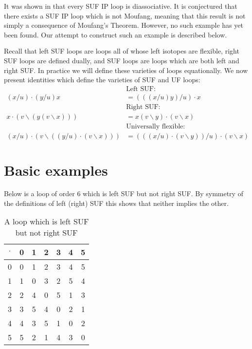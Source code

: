 \documentclass[12pt]{report}
\theoremstyle{definition}
\newcommand{\ldv}{\backslash}       %
\newcommand{\rdv}{/}                %
\begin{document}
It was shown in \cite{SUF} that every SUF IP loop is diassociative. It is conjectured that there
  exists a SUF IP loop which is not Moufang, meaning that this result is not simply a consequence
  of Moufang's Theorem. However, no such example has yet been found. Our attempt to construct such
  an example is described below.

Recall that left SUF loops are loops all of whose left isotopes are flexible, right SUF loops are
  defined dually, and SUF loops are loops which are both left and right SUF. In practice we will
  define these varieties of loops equationally. We now present identities which define the
  varieties of SUF and UF loops:
\begin{align*}
  &\text{Left SUF:}\\
  (x\rdv u) \cdot (y\rdv u)x &= (((x\rdv u)y)\rdv u)\cdot x\\
  &\text{Right SUF:}\\
  x\cdot (v\ldv(y(v\ldv x))) &= x(v\ldv y)\cdot (v\ldv x)\\
  &\text{Universally flexible:}\\
  (x\rdv u)\cdot (v\ldv ((y\rdv u)\cdot (v\ldv x))) &= (((x\rdv u)\cdot (v\ldv y))\rdv u)\cdot (v\ldv x)
\end{align*}

\section{Basic examples}

Below is a loop of order $6$ which is left SUF but not right SUF. By symmetry of the definitions of
  left (right) SUF this shows that neither implies the other.

\begin{table}[H]
  \centering
  \begin{tabular}{c| c c c c c c}
      $\cdot$ & 0 & 1 & 2 & 3 & 4 & 5\\
      \hline\hline
      0 & 0 & 1 & 2 & 3 & 4 & 5\\
      1 & 1 & 0 & 3 & 2 & 5 & 4\\
      2 & 2 & 4 & 0 & 5 & 1 & 3\\
      3 & 3 & 5 & 4 & 0 & 2 & 1\\
      4 & 4 & 3 & 5 & 1 & 0 & 2\\
      5 & 5 & 2 & 1 & 4 & 3 & 0
  \end{tabular}
  \caption{A loop which is left SUF but not right SUF}
\end{table}
\end{document}

